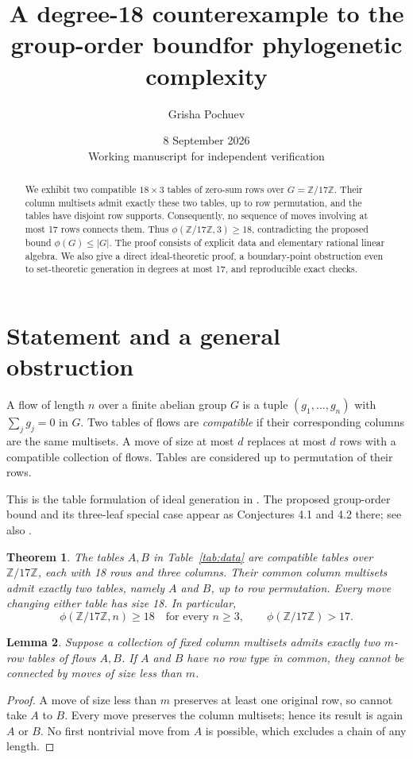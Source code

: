 \documentclass[11pt,a4paper]{article}
\title{A degree-18 counterexample to the group-order bound\newline for phylogenetic complexity}
\author{Grisha Pochuev}
\date{8 September 2026\\[3pt]\small Working manuscript for independent verification}
\newtheorem{theorem}{Theorem}
\newtheorem{lemma}[theorem]{Lemma}
\newcommand{\ZZ}{\mathbb Z}
\begin{document}
\maketitle
\begin{abstract}
We exhibit two compatible $18\times3$ tables of zero-sum rows over
$G=\ZZ/17\ZZ$. Their column multisets admit exactly these two tables,
up to row permutation, and the tables have disjoint row supports.
Consequently, no sequence of moves involving at most 17 rows connects
them. Thus $\phi(\ZZ/17\ZZ,3)\geq18$, contradicting the proposed bound
$\phi(G)\leq |G|$. The proof consists of explicit data and elementary
rational linear algebra. We also give a direct ideal-theoretic proof,
a boundary-point obstruction even to set-theoretic generation in degrees
at most 17, and reproducible exact checks.
\end{abstract}

\section{Statement and a general obstruction}
A flow of length $n$ over a finite abelian group $G$ is a tuple
$(g_1,\ldots,g_n)$ with $\sum_j g_j=0$ in $G$.
Two tables of flows are \emph{compatible} if their corresponding columns
are the same multisets. A move of size at most $d$ replaces at most $d$
rows with a compatible collection of flows. Tables are considered up to
permutation of their rows.

This is the table formulation of ideal generation in
\cite[Section 2]{MV}. The proposed group-order bound and its three-leaf
special case appear as Conjectures 4.1 and 4.2 there; see also
\cite[Conjecture 27 in the arXiv version]{SS}.

\begin{theorem}\label{thm:main}
The tables $A,B$ in Table~\ref{tab:data} are compatible tables over
$\ZZ/17\ZZ$, each with 18 rows and three columns. Their common column
multisets admit exactly two tables, namely $A$ and $B$, up to row
permutation. Every move changing either table has size 18. In particular,
\[
 \phi(\ZZ/17\ZZ,n)\geq18\quad\text{for every }n\geq3,
 \qquad \phi(\ZZ/17\ZZ)>17.
\]
\end{theorem}

\begin{lemma}\label{lem:two}
Suppose a collection of fixed column multisets admits exactly two
$m$-row tables of flows $A,B$. If $A$ and $B$ have no row type in common,
they cannot be connected by moves of size less than $m$.
\end{lemma}
\begin{proof}
A move of size less than $m$ preserves at least one original row, so
cannot take $A$ to $B$. Every move preserves the column multisets; hence
its result is again $A$ or $B$. No first nontrivial move from $A$ is
possible, which excludes a chain of any length.
\end{proof}
\end{document}
